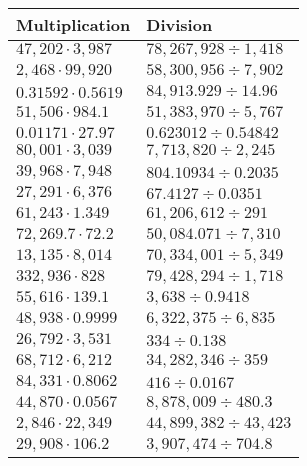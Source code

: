 \begin{longtable}[]{@{}ll@{}}
\toprule
Multiplication & Division\tabularnewline
\midrule
\endhead
\(47,202\cdot3,987\) & \(78,267,928÷1,418\)\tabularnewline
\(2,468\cdot99,920\) & \(58,300,956÷7,902\)\tabularnewline
\(0.31592\cdot0.5619\) & \(84,913.929÷14.96\)\tabularnewline
\(51,506\cdot984.1\) & \(51,383,970÷5,767\)\tabularnewline
\(0.01171\cdot27.97\) & \(0.623012÷0.54842\)\tabularnewline
\(80,001\cdot3,039\) & \(7,713,820÷2,245\)\tabularnewline
\(39,968\cdot7,948\) & \(804.10934÷0.2035\)\tabularnewline
\(27,291\cdot6,376\) & \(67.4127÷0.0351\)\tabularnewline
\(61,243\cdot1.349\) & \(61,206,612÷291\)\tabularnewline
\(72,269.7\cdot72.2\) & \(50,084.071÷7,310\)\tabularnewline
\(13,135\cdot8,014\) & \(70,334,001÷5,349\)\tabularnewline
\(332,936\cdot828\) & \(79,428,294÷1,718\)\tabularnewline
\(55,616\cdot139.1\) & \(3,638÷0.9418\)\tabularnewline
\(48,938\cdot0.9999\) & \(6,322,375÷6,835\)\tabularnewline
\(26,792\cdot3,531\) & \(334÷0.138\)\tabularnewline
\(68,712\cdot6,212\) & \(34,282,346÷359\)\tabularnewline
\(84,331\cdot0.8062\) & \(416÷0.0167\)\tabularnewline
\(44,870\cdot0.0567\) & \(8,878,009÷480.3\)\tabularnewline
\(2,846\cdot 22,349\) & \(44,899,382÷43,423\)\tabularnewline
\(29,908\cdot106.2\) & \(3,907,474÷704.8\)\tabularnewline
\bottomrule
\end{longtable}
